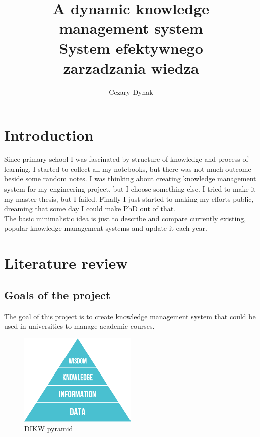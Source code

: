 \documentclass{report}
\title{A dynamic knowledge \\ management system \\
  \small System efektywnego \\ zarzadzania wiedza}
\author{Cezary Dynak}
\begin{document}


\maketitle

\tableofcontents

\chapter{Introduction}

Since primary school I was fascinated by structure of knowledge and process of
learning. I started to collect all my notebooks, but there was not much outcome
beside some random notes. I was thinking about creating knowledge management
system for my engineering project, but I choose something else. I tried to make
it my master thesis, but I failed. Finally I just started to making my efforts
public, dreaming that some day I could make PhD out of that. \\

The basic minimalistic idea is just to describe and compare currently existing,
popular knowledge management systems and update it each year.

\chapter{Literature review}
\label{chapter:literature-review}
\section{Goals of the project}
The goal of this project is to create knowledge management system that could
be used in universities to manage academic courses. \cite{web:esco-api}

\begin{figure}[htbp]
  \centering
    \includegraphics[width=0.5\textwidth]{dikw-pyramid.png}
  \caption{DIKW pyramid}
  \label{fig:panel-dotykowy}
\end{figure}
\end{document}
